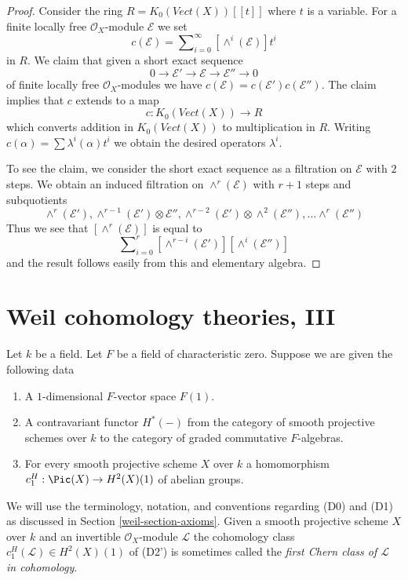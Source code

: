 \begin{proof}
Consider the ring $R = K_0(\textit{Vect}(X))[[t]]$ where $t$ is a
variable. For a finite locally free $\mathcal{O}_X$-module
$\mathcal{E}$ we set
$$
c(\mathcal{E}) = \sum\nolimits_{i = 0}^\infty [\wedge^i(\mathcal{E})] t^i
$$
in $R$. We claim that given a short exact sequence
$$
0 \to \mathcal{E}' \to \mathcal{E} \to \mathcal{E}'' \to 0
$$
of finite locally free $\mathcal{O}_X$-modules
we have $c(\mathcal{E}) = c(\mathcal{E}') c(\mathcal{E}'')$.
The claim implies that $c$ extends to a map
$$
c :  K_0(\textit{Vect}(X)) \longrightarrow R
$$
which converts addition in $K_0(\textit{Vect}(X))$ to multiplication in $R$.
Writing $c(\alpha) = \sum \lambda^i(\alpha) t^i$ we obtain the desired
operators $\lambda^i$.

\medskip\noindent
To see the claim, we consider the short exact sequence as a
filtration on $\mathcal{E}$ with $2$ steps. We obtain an induced
filtration on $\wedge^r(\mathcal{E})$ with $r + 1$ steps and
subquotients
$$
\wedge^r(\mathcal{E}'),
\wedge^{r - 1}(\mathcal{E}') \otimes \mathcal{E}'',
\wedge^{r - 2}(\mathcal{E}') \otimes \wedge^2(\mathcal{E}''), \ldots
\wedge^r(\mathcal{E}'')
$$
Thus we see that $[\wedge^r(\mathcal{E})]$ is equal to
$$
\sum\nolimits_{i = 0}^r
[\wedge^{r - i}(\mathcal{E}')] [\wedge^i(\mathcal{E}'')]
$$
and the result follows easily from this and elementary algebra.
\end{proof}

\section{Weil cohomology theories, III}
\label{weil-section-c1}
Let $k$ be a field. Let $F$ be a field of characteristic zero.
Suppose we are given the following data
\begin{enumerate}
\item[(D0)] A $1$-dimensional $F$-vector space $F(1)$.
\item[(D1)] A contravariant functor $H^*(-)$ from the category of smooth
projective schemes over $k$ to the category of graded commutative
$F$-algebras.
\item[(D2')] For every smooth projective scheme $X$ over $k$ a homomorphism
$c_1^H : \Pic(X) \to H^2(X)(1)$ of abelian groups.
\end{enumerate}
We will use the terminology, notation, and conventions regarding
(D0) and (D1) as discussed in Section \ref{weil-section-axioms}.
Given a smooth projective scheme $X$ over $k$ and an invertible
$\mathcal{O}_X$-module $\mathcal{L}$ the cohomology class
$c_1^H(\mathcal{L}) \in H^2(X)(1)$ of (D2')
is sometimes called the {\it first Chern class of $\mathcal{L}$
in cohomology}.

